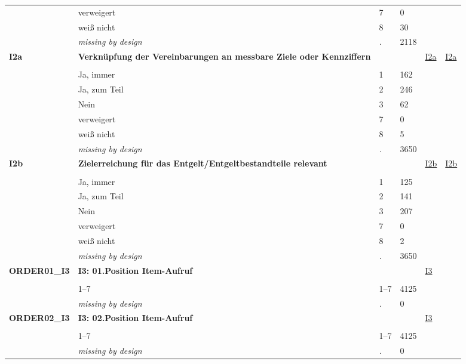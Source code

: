 \begin{longtable}{| L{2.45cm} | L{6cm} | C{1.5cm} | R{1cm} | C{2.25cm} | C{2.25cm} |}
   & verweigert & 7 & 0 &  &  \\ 
   & weiß nicht & 8 & 30 &  &  \\ 
   & \textit{missing by design} & \textit{.} & 2118 &  &  \\ 
   \midrule
\textbf{I2a}\label{var:I2a} & \textbf{Verknüpfung der Vereinbarungen an messbare Ziele oder Kennziffern} &  &  & \hyperref[I2a]{I2a} & \hyperref[var:suf:I2a]{I2a} \\ 
   &  &  &  &  &  \\ 
   & Ja, immer & 1 & 162 &  &  \\ 
   & Ja, zum Teil & 2 & 246 &  &  \\ 
   & Nein & 3 & 62 &  &  \\ 
   & verweigert & 7 & 0 &  &  \\ 
   & weiß nicht & 8 & 5 &  &  \\ 
   & \textit{missing by design} & \textit{.} & 3650 &  &  \\ 
   \midrule
\textbf{I2b}\label{var:I2b} & \textbf{Zielerreichung für das Entgelt/Entgeltbestandteile relevant} &  &  & \hyperref[I2b]{I2b} & \hyperref[var:suf:I2b]{I2b} \\ 
   &  &  &  &  &  \\ 
   & Ja, immer & 1 & 125 &  &  \\ 
   & Ja, zum Teil & 2 & 141 &  &  \\ 
   & Nein & 3 & 207 &  &  \\ 
   & verweigert & 7 & 0 &  &  \\ 
   & weiß nicht & 8 & 2 &  &  \\ 
   & \textit{missing by design} & \textit{.} & 3650 &  &  \\ 
   \midrule
\textbf{ORDER01\_I3}\label{var:ORDER01:I3} & \textbf{I3: 01.Position Item-Aufruf} &  &  & \hyperref[I3]{I3} & \hyperref[var:suf:]{} \\ 
   &  &  &  &  &  \\ 
   & 1--7 & 1--7 & 4125 &  &  \\ 
   & \textit{missing by design} & \textit{.} & 0 &  &  \\ 
   \midrule
\textbf{ORDER02\_I3}\label{var:ORDER02:I3} & \textbf{I3: 02.Position Item-Aufruf} &  &  & \hyperref[I3]{I3} & \hyperref[var:suf:]{} \\ 
   &  &  &  &  &  \\ 
   & 1--7 & 1--7 & 4125 &  &  \\ 
   & \textit{missing by design} & \textit{.} & 0 &  &  \\ 

\end{longtable}
